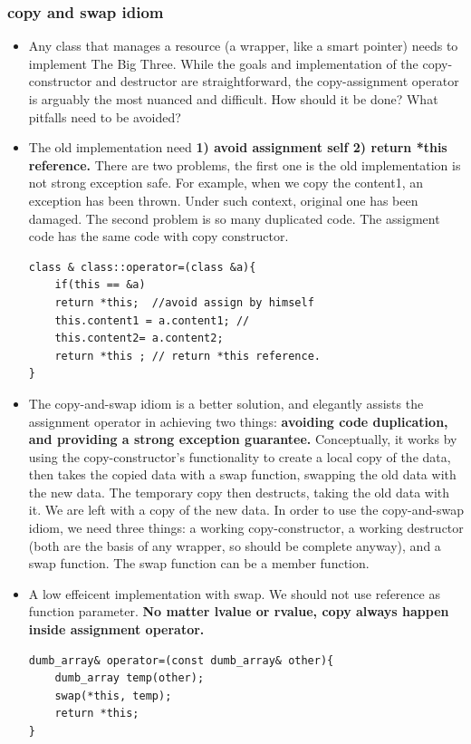\documentclass[a4paper,11pt,twoside]{book}
\begin{document}
\subsubsection{copy and swap idiom}
\begin{itemize}
	\item Any class that manages a resource (a wrapper, like a smart pointer) needs to implement The Big Three. While the goals and implementation of the copy-constructor and destructor are straightforward, the copy-assignment operator is arguably the most nuanced and difficult. How should it be done? What pitfalls need to be avoided?
	
	\item The old implementation need  \textbf{1) avoid assignment self 2) return *this reference. }There are two problems, the first one is the old implementation is not strong exception safe. For example, when we copy the content1, an exception has been thrown. Under such context, original one has been damaged. The second problem is so many duplicated code. The assigment code has the same code with copy constructor.
\begin{lstlisting}[numbers=none]
class & class::operator=(class &a){
	if(this == &a)
	return *this;  //avoid assign by himself
    this.content1 = a.content1; //
    this.content2= a.content2; 
	return *this ; // return *this reference.
}	
\end{lstlisting}
	
	\item The copy-and-swap idiom is a better solution, and elegantly assists the assignment operator in achieving two things: \textbf{avoiding code duplication, and providing a strong exception guarantee.}  Conceptually, it works by using the copy-constructor's functionality to create a local copy of the data, then takes the copied data with a swap function, swapping the old data with the new data. The temporary copy then destructs, taking the old data with it. We are left with a copy of the new data. In order to use the copy-and-swap idiom, we need three things: a working copy-constructor, a working destructor (both are the basis of any wrapper, so should be complete anyway), and a swap function. The swap function can be a member function.
    \item A low effeicent implementation with swap. We should not use reference as function parameter. \textbf{No matter lvalue or rvalue, copy always happen inside assignment operator.}
\begin{lstlisting}[numbers=none]
dumb_array& operator=(const dumb_array& other){
	dumb_array temp(other);
	swap(*this, temp);
	return *this;
}	


\end{lstlisting}
\end{itemize}
\end{document}
